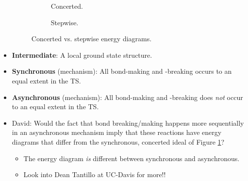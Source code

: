 \documentclass[../notes.tex]{subfiles}
\begin{document}
\begin{itemize}
    \begin{figure}[h!]
        \centering
        \begin{subfigure}[b]{0.25\linewidth}
            \centering
            \caption{Concerted.}
            \label{fig:concertedStepwiseNrga}
        \end{subfigure}
        \begin{subfigure}[b]{0.25\linewidth}
            \centering
            \caption{Stepwise.}
            \label{fig:concertedStepwiseNrgb}
        \end{subfigure}
        \caption{Concerted vs. stepwise energy diagrams.}
        \label{fig:concertedStepwiseNrg}
    \end{figure}
    \item \textbf{Intermediate}: A local ground state structure.
    \item \textbf{Synchronous} (mechanism): All bond-making and -breaking occurs to an equal extent in the TS.
    \item \textbf{Asynchronous} (mechanism): All bond-making and -breaking does \emph{not} occur to an equal extent in the TS.
    \item David: Would the fact that bond breaking/making happens more sequentially in an asynchronous mechanism imply that these reactions have energy diagrams that differ from the synchronous, concerted ideal of Figure \ref{fig:concertedStepwiseNrga}?
    \begin{itemize}
        \item The energy diagram \emph{is} different between synchronous and asynchronous.
        \item Look into Dean Tantillo at UC-Davis for more!!

\end{itemize}
\end{itemize}
\end{document}
